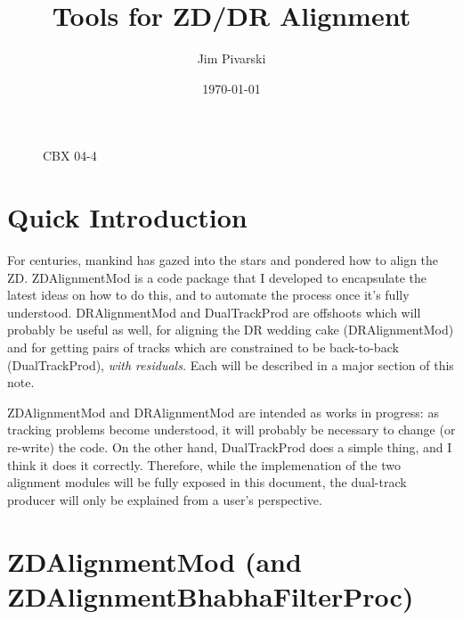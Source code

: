 \documentclass[12pt]{article}
\title{Tools for ZD/DR Alignment}
\author{Jim Pivarski}
\date{\today}
\begin{document}
\begin{figure} \flushright CBX 04-4 \end{figure}

\maketitle


\pagebreak
\tableofcontents

\section{Quick Introduction}

For centuries, mankind has gazed into the stars and pondered how to
align the ZD.  ZDAlignmentMod is a code package that I developed to
encapsulate the latest ideas on how to do this, and to automate the
process once it's fully understood.  DRAlignmentMod and DualTrackProd
are offshoots which will probably be useful as well, for aligning the
DR wedding cake (DRAlignmentMod) and for getting pairs of tracks which
are constrained to be back-to-back (DualTrackProd), {\it with
residuals.}  Each will be described in a major section of this note.

ZDAlignmentMod and DRAlignmentMod are intended as works in progress:
as tracking problems become understood, it will probably be necessary
to change (or re-write) the code.  On the other hand, DualTrackProd
does a simple thing, and I think it does it correctly.  Therefore,
while the implemenation of the two alignment modules will be fully
exposed in this document, the dual-track producer will only be
explained from a user's perspective.

\section{ZDAlignmentMod {\normalsize (and ZDAlignmentBhabhaFilterProc)}}
\end{document}
